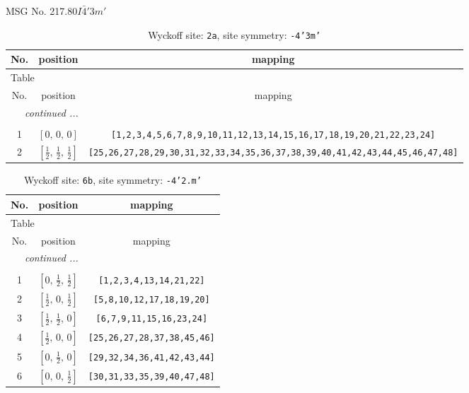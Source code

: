 \documentclass[fleqn,8pt]{jsarticle}
\begin{document}
\setcounter{MaxMatrixCols}{32}

\renewcommand{\tablename}{Table~}
\renewcommand{\figurename}{Figure~}
\begin{center}
\LARGE
MSG No. 217.80\quad$I\bar{4}'3m'$
\end{center}
\renewcommand{\arraystretch}{1.2}
\begin{longtable}{ccc}
\caption{Wyckoff site: {\tt 2a}, site symmetry: {\tt -4'3m'}}
 \\
 \hline \hline
No. & position & mapping \\ \hline \endfirsthead

\multicolumn{2}{l}{\tablename\ \thetable{}} \\
 \hline \hline
No. & position & mapping \\ \hline \endhead

 \hline \hline
\multicolumn{2}{r}{\footnotesize\it continued ...} \\ \endfoot

 \hline \hline
\multicolumn{2}{r}{} \\ \endlastfoot

1 & $\left[ 0,\, 0,\, 0 \right]$ & {\tt [1,2,3,4,5,6,7,8,9,10,11,12,13,14,15,16,17,18,19,20,21,22,23,24]} \\ \hline
2 & $\left[ \frac{1}{2},\, \frac{1}{2},\, \frac{1}{2} \right]$ & {\tt [25,26,27,28,29,30,31,32,33,34,35,36,37,38,39,40,41,42,43,44,45,46,47,48]} \\
\end{longtable}
\renewcommand{\arraystretch}{1.2}
\begin{longtable}{ccc}
\caption{Wyckoff site: {\tt 6b}, site symmetry: {\tt -4'2.m'}}
 \\
 \hline \hline
No. & position & mapping \\ \hline \endfirsthead

\multicolumn{2}{l}{\tablename\ \thetable{}} \\
 \hline \hline
No. & position & mapping \\ \hline \endhead

 \hline \hline
\multicolumn{2}{r}{\footnotesize\it continued ...} \\ \endfoot

 \hline \hline
\multicolumn{2}{r}{} \\ \endlastfoot

1 & $\left[ 0,\, \frac{1}{2},\, \frac{1}{2} \right]$ & {\tt [1,2,3,4,13,14,21,22]} \\ \hline
2 & $\left[ \frac{1}{2},\, 0,\, \frac{1}{2} \right]$ & {\tt [5,8,10,12,17,18,19,20]} \\ \hline
3 & $\left[ \frac{1}{2},\, \frac{1}{2},\, 0 \right]$ & {\tt [6,7,9,11,15,16,23,24]} \\ \hline
4 & $\left[ \frac{1}{2},\, 0,\, 0 \right]$ & {\tt [25,26,27,28,37,38,45,46]} \\ \hline
5 & $\left[ 0,\, \frac{1}{2},\, 0 \right]$ & {\tt [29,32,34,36,41,42,43,44]} \\ \hline
6 & $\left[ 0,\, 0,\, \frac{1}{2} \right]$ & {\tt [30,31,33,35,39,40,47,48]} \\
\end{longtable}
\end{document}

